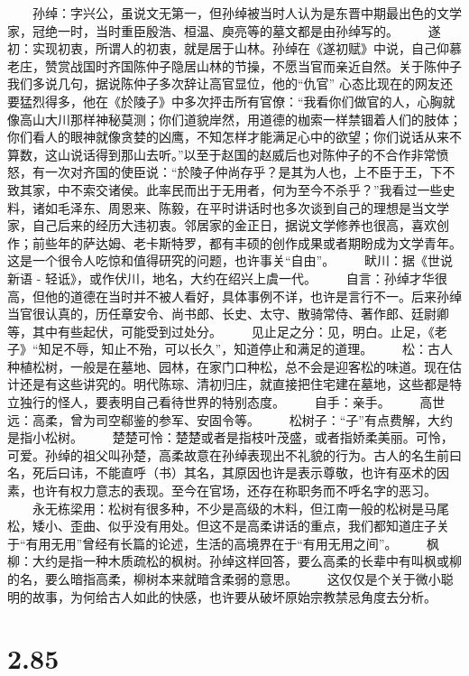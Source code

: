 \documentclass[]{book}
\begin{document}
　　孙绰：字兴公，虽说文无第一，但孙绰被当时人认为是东晋中期最出色的文学家，冠绝一时，当时重臣殷浩、桓温、庾亮等的墓文都是由孙绰写的。
　　遂初：实现初衷，所谓人的初衷，就是居于山林。孙绰在《遂初赋》中说，自己仰慕老庄，赞赏战国时齐国陈仲子隐居山林的节操，不愿当官而亲近自然。关于陈仲子我们多说几句，据说陈仲子多次辞让高官显位，他的``仇官''
心态比现在的网友还要猛烈得多，他在《於陵子》中多次抨击所有官僚：``我看你们做官的人，心胸就像高山大川那样神秘莫测；你们道貌岸然，用道德的枷索一样禁锢着人们的肢体；你们看人的眼神就像贪婪的凶鹰，不知怎样才能满足心中的欲望；你们说话从来不算数，这山说话得到那山去听。''以至于赵国的赵威后也对陈仲子的不合作非常愤怒，有一次对齐国的使臣说：``於陵子仲尚存乎？是其为人也，上不臣于王，下不致其家，中不索交诸侯。此率民而出于无用者，何为至今不杀乎？''我看过一些史料，诸如毛泽东、周恩来、陈毅，在平时讲话时也多次谈到自己的理想是当文学家，自己后来的经历大违初衷。邻居家的金正日，据说文学修养也很高，喜欢创作；前些年的萨达姆、老卡斯特罗，都有丰硕的创作成果或者期盼成为文学青年。这是一个很令人吃惊和值得研究的问题，也许事关``自由''。
　　畎川：据《世说新语 - 轻诋》，或作伏川，地名，大约在绍兴上虞一代。
　　自言：孙绰才华很高，但他的道德在当时并不被人看好，具体事例不详，也许是言行不一。后来孙绰当官很认真的，历任章安令、尚书郎、长史、太守、散骑常侍、著作郎、廷尉卿等，其中有些起伏，可能受到过处分。
　　见止足之分：见，明白。止足，《老子》``知足不辱，知止不殆，可以长久''，知道停止和满足的道理。
　　松：古人种植松树，一般是在墓地、园林，在家门口种松，总不会是迎客松的味道。现在估计还是有这些讲究的。明代陈琮、清初归庄，就直接把住宅建在墓地，这些都是特立独行的怪人，要表明自己看待世界的特别态度。
　　自手：亲手。 　　高世远：高柔，曾为司空郗鉴的参军、安固令等。
　　松树子：``子''有点费解，大约是指小松树。
　　楚楚可怜：楚楚或者是指枝叶茂盛，或者指娇柔美丽。可怜，可爱。孙绰的祖父叫孙楚，高柔故意在孙绰表现出不礼貌的行为。古人的名生前曰名，死后曰讳，不能直呼（书）其名，其原因也许是表示尊敬，也许有巫术的因素，也许有权力意志的表现。至今在官场，还存在称职务而不呼名字的恶习。
　　永无栋梁用：松树有很多种，不少是高级的木料，但江南一般的松树是马尾松，矮小、歪曲、似乎没有用处。但这不是高柔讲话的重点，我们都知道庄子关于``有用无用''曾经有长篇的论述，生活的高境界在于``有用无用之间''。
　　枫柳：大约是指一种木质疏松的枫树。孙绰这样回答，要么高柔的长辈中有叫枫或柳的名，要么暗指高柔，柳树本来就暗含柔弱的意思。
　　这仅仅是个关于微小聪明的故事，为何给古人如此的快感，也许要从破坏原始宗教禁忌角度去分析。

\section{2.85}\label{section-131}
\end{document}
